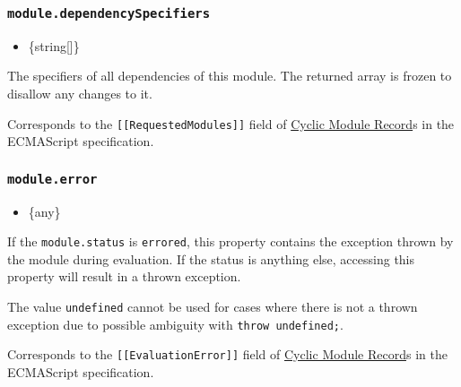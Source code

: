 \begin{Shaded}
\begin{Highlighting}[]
  \CommentTok{//}

  \NormalTok{()}\OperatorTok{;}
\NormalTok{\})()}\OperatorTok{;}
\end{Highlighting}
\end{Shaded}

\subsubsection{\texorpdfstring{\texttt{module.dependencySpecifiers}}{module.dependencySpecifiers}}\label{module.dependencyspecifiers}

\begin{itemize}
\tightlist
\item
  \{string{[}{]}\}
\end{itemize}

The specifiers of all dependencies of this module. The returned array is
frozen to disallow any changes to it.

Corresponds to the \texttt{{[}{[}RequestedModules{]}{]}} field of
\href{https://tc39.es/ecma262/\#sec-cyclic-module-records}{Cyclic Module
Record}s in the ECMAScript specification.

\subsubsection{\texorpdfstring{\texttt{module.error}}{module.error}}\label{module.error}

\begin{itemize}
\tightlist
\item
  \{any\}
\end{itemize}

If the \texttt{module.status} is
\texttt{\textquotesingle{}errored\textquotesingle{}}, this property
contains the exception thrown by the module during evaluation. If the
status is anything else, accessing this property will result in a thrown
exception.

The value \texttt{undefined} cannot be used for cases where there is not
a thrown exception due to possible ambiguity with
\texttt{throw\ undefined;}.

Corresponds to the \texttt{{[}{[}EvaluationError{]}{]}} field of
\href{https://tc39.es/ecma262/\#sec-cyclic-module-records}{Cyclic Module
Record}s in the ECMAScript specification.

